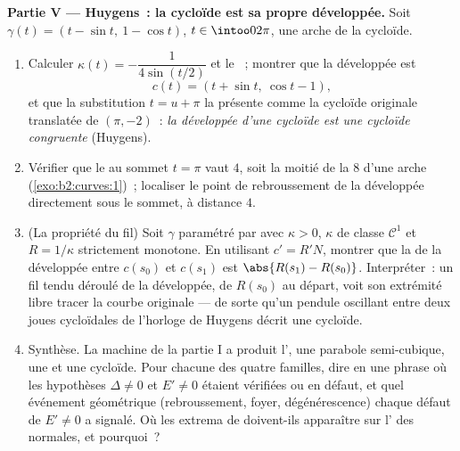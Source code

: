 \begin{problem}
\medskip
\noindent\textbf{Partie V --- Huygens~: la cycloïde est sa propre
développée.} Soit $\gamma(t) = (t - \sin t,\ 1 - \cos t)$, $t \in
\intoo0{2\pi}$, une arche de la cycloïde.
\begin{enumerate}[resume]
  \item Calculer $\kappa(t) = -\dfrac1{4\sin(t/2)}$ et le
        ~; montrer que la développée est
        \[
        c(t) = (t + \sin t,\ \cos t - 1),
        \]
        et que la substitution $t = u + \pi$ la présente
        comme la cycloïde originale translatée de $(\pi, -2)$~:
        \emph{la développée d'une cycloïde est une cycloïde
        congruente} (Huygens).
  \item Vérifier que le  au sommet $t =
        \pi$ vaut $4$, soit la moitié de la  $8$ d'une
        arche (\cref{exo:b2:curves:1})~; localiser le point de
        rebroussement de la développée directement sous le sommet,
        à distance $4$.
  \item (La propriété du fil) Soit $\gamma$ paramétré par  avec
        $\kappa > 0$, $\kappa$ de classe $\mathcal C^1$ et
        $R = 1/\kappa$ strictement monotone. En utilisant $c' = R'N$,
        montrer que la  de la développée entre
        $c(s_0)$ et $c(s_1)$ est $\abs{R(s_1) - R(s_0)}$.
        Interpréter~: un fil tendu déroulé de la développée,
        de  $R(s_0)$ au départ, voit son extrémité libre
        tracer la courbe originale --- de sorte qu'un pendule
        oscillant entre deux joues cycloïdales de l'horloge de
        Huygens décrit une cycloïde.
  \item Synthèse. La machine de la partie I a produit
        l', une parabole semi-cubique, une  et
        une cycloïde. Pour chacune des quatre familles, dire en une
        phrase où les hypothèses $\Delta \neq 0$ et
        $E' \neq 0$ étaient vérifiées ou en défaut, et quel
        événement géométrique (rebroussement, foyer,
        dégénérescence) chaque défaut de $E' \neq 0$
        a signalé. Où les extrema de  doivent-ils
        apparaître sur l' des normales, et pourquoi~?
\end{enumerate}
\end{problem}
